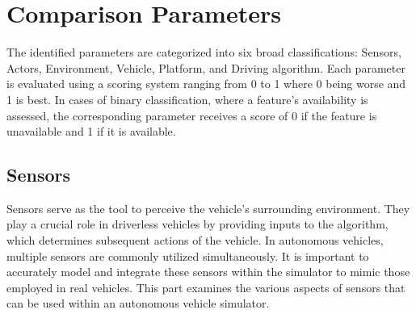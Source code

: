 \documentclass[12pt,twoside,a4paper,parskip]{scrbook} %
\begin{document}
\section{Comparison Parameters}
The identified parameters are categorized into six broad classifications: Sensors, Actors, Environment, Vehicle, Platform, and Driving algorithm. Each parameter is evaluated using a scoring system ranging from 0 to 1 where 0 being worse and 1 is  best. In cases of binary classification, where a feature's availability is assessed, the corresponding parameter receives a score of 0 if the feature is unavailable and 1 if it is available.
\subsection{Sensors}
Sensors serve as the tool to perceive the vehicle's surrounding environment. They play a crucial role in driverless vehicles by providing inputs to the algorithm, which determines subsequent actions of the vehicle. In autonomous vehicles, multiple sensors are commonly utilized simultaneously. It is important to accurately model and integrate these sensors within the simulator to mimic those employed in real vehicles. This part examines the various aspects of sensors that can be used within an autonomous vehicle simulator.
\end{document}
